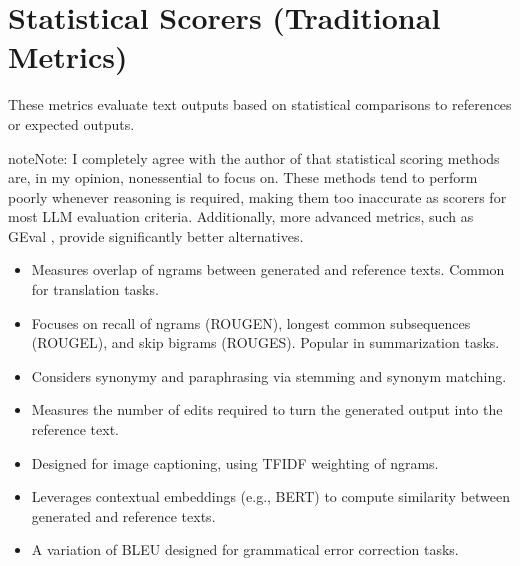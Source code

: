 \documentclass[letterpaper,11pt,english]{sphinxmanual}
\begin{document}
\section{Statistical Scorers (Traditional Metrics)}
\label{\detokenize{evaluation:statistical-scorers-traditional-metrics}}
\sphinxAtStartPar
These metrics evaluate text outputs based on statistical comparisons to references
or expected outputs.

\begin{sphinxadmonition}{note}{Note:}
\sphinxAtStartPar
I completely agree with the author of 
that statistical scoring methods are,
in my opinion, non\sphinxhyphen{}essential to focus on. These methods tend to perform poorly
whenever reasoning is required, making them too inaccurate as scorers for
most LLM evaluation criteria. Additionally, more advanced metrics,
such as GEval {\hyperref[\detokenize{evaluation:sec-geval}]{}}, provide significantly better alternatives.
\end{sphinxadmonition}
\begin{itemize}
\item {} 
\sphinxAtStartPar
{}
Measures overlap of n\sphinxhyphen{}grams between generated and reference texts.
Common for translation tasks.

\item {} 
\sphinxAtStartPar
{}
Focuses on recall of n\sphinxhyphen{}grams (ROUGE\sphinxhyphen{}N), longest common subsequences (ROUGE\sphinxhyphen{}L),
and skip bigrams (ROUGE\sphinxhyphen{}S). Popular in summarization tasks.

\item {} 
\sphinxAtStartPar
{}
Considers synonymy and paraphrasing via stemming and synonym matching.

\item {} 
\sphinxAtStartPar
{}
Measures the number of edits required to turn the generated output into the
reference text.

\item {} 
\sphinxAtStartPar
{}
Designed for image captioning, using TF\sphinxhyphen{}IDF weighting of n\sphinxhyphen{}grams.

\item {} 
\sphinxAtStartPar
{}
Leverages contextual embeddings (e.g., BERT) to compute similarity between
generated and reference texts.

\item {} 
\sphinxAtStartPar
{}
A variation of BLEU designed for grammatical error correction tasks.

\end{itemize}
\end{document}

